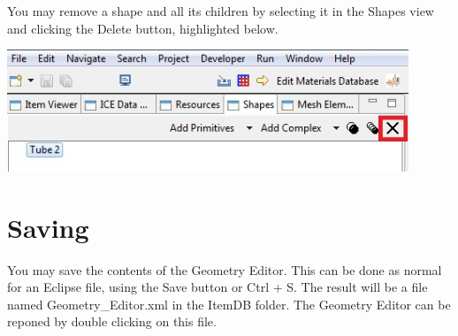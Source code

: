 You may remove a shape and all its children by selecting it in the Shapes view
and clicking the Delete button, highlighted below.

\begin{center}
\includegraphics[width=12cm]{images/GeometryDeleteButton.jpg}
\end{center}

\section{Saving}

You may save the contents of the Geometry Editor. This can be done as normal for
an Eclipse file, using the Save button or Ctrl + S. The result will be a file
named Geometry\_Editor.xml in the ItemDB folder. The Geometry Editor can be
reponed by double clicking on this file. 
